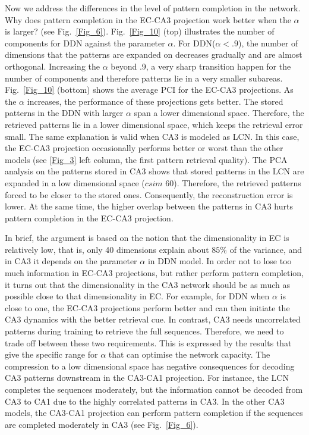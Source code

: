 \documentclass[utf8]{frontiersSCNS} %
\begin{document}
Now we address the differences in the level of pattern completion in the network. 
%
Why does pattern completion in the EC-CA3 projection work better when the $\alpha$ is larger? (see Fig.~\ref{Fig_6}). 
%
Fig.~\ref{Fig_10} (top) illustrates the number of components for DDN against the parameter $\alpha$. For DDN($\alpha < .9$), the number of dimensions that the patterns are expanded on decreases gradually and are almost orthogonal.
Increasing the $\alpha$ beyond .9, a very sharp transition happen for the number of components and therefore patterns lie in a very smaller subareas. 
%
Fig.~\ref{Fig_10} (bottom) shows the average PCI for the EC-CA3 projections. As the $\alpha$ increases, the performance of these projections gets better.    
%
The stored patterns in the DDN with larger $\alpha $ span a lower dimensional space. 
%
Therefore, the retrieved patterns lie in a lower dimensional space, which keeps the retrieval error small.
%
The same explanation is valid when CA3 is modeled as LCN. In this case, the EC-CA3 projection occasionally performs better or worst than the other models (see \ref{Fig_3} left column, the first pattern retrieval quality). The PCA analysis on the patterns stored in CA3 shows that stored patterns in the LCN  are expanded in a low dimensional space ($csim$ 60). Therefore, the retrieved patterns forced to be closer to the stored ones. Consequently, the reconstruction error is lower. At the same time, the higher overlap between the patterns in CA3 hurts pattern completion in the EC-CA3 projection. 

In brief, the argument is based on the notion that the dimensionality in EC is relatively low, that is, only 40 dimensions explain about $85 \%$ of the variance, and in CA3 it depends on the parameter $\alpha$ in DDN model. In order not to lose too much information in EC-CA3 projections, but rather perform pattern completion, it turns out that the dimensionality in the CA3 network should be as much as possible close to that dimensionality in EC. For example, for DDN when $\alpha$ is close to one, the EC-CA3 projections perform better and can then initiate the CA3 dynamics with the better retrieval cue. In contrast, CA3 needs uncorrelated patterns during training to retrieve the full sequences.  Therefore, we need to trade off between these two requirements. This is expressed by the results that give the specific range for $\alpha$ that can optimise the network capacity. 
%
The compression to a low dimensional space has negative consequences for decoding CA3 patterns downstream in the CA3-CA1 projection. For instance, the LCN completes the sequences moderately, but the information cannot be decoded from CA3 to CA1 due to the highly correlated patterns in CA3. In the other CA3 models, the CA3-CA1 projection can perform pattern completion if the sequences are completed moderately in CA3 (see Fig.~\ref{Fig_6}). 
%     
   
\end{document}

